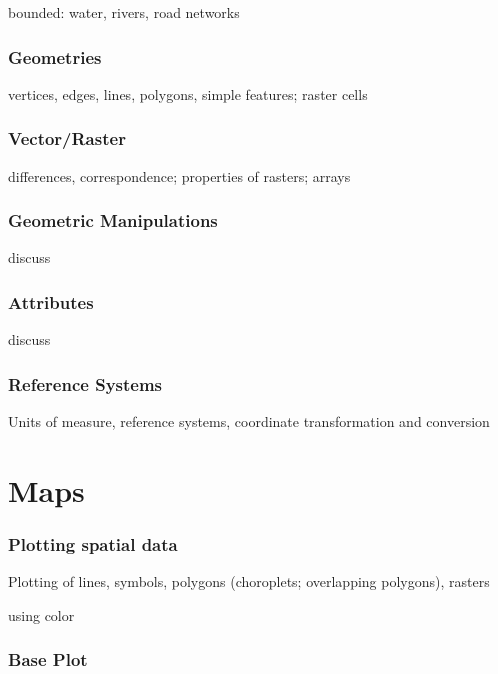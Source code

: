 \documentclass[]{krantz}
\theoremstyle{definition}
\theoremstyle{definition}
\theoremstyle{definition}
\theoremstyle{remark}
\begin{document}
bounded: water, rivers, road networks

\section{Geometries}\label{geometries}

vertices, edges, lines, polygons, simple features; raster cells

\section{Vector/Raster}\label{vectorraster}

differences, correspondence; properties of rasters; arrays

\section{Geometric Manipulations}\label{geometric-manipulations}

discuss

\section{Attributes}\label{attributes}

discuss

\section{Reference Systems}\label{reference-systems}

Units of measure, reference systems, coordinate transformation and
conversion

\part{Maps}\label{part-maps}

\section{Plotting spatial data}\label{plotting-spatial-data}

Plotting of lines, symbols, polygons (choroplets; overlapping polygons),
rasters

using color

\section{Base Plot}\label{base-plot}
\end{document}
